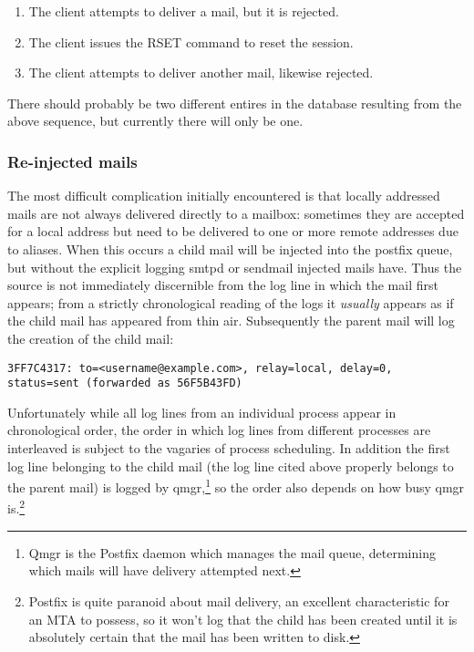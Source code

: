 \documentclass[a4paper,12pt,draft]{article}
\begin{document}
\begin{enumerate}

    \item The client attempts to deliver a mail, but it is rejected.

    \item The client issues the RSET command to reset the session.

    \item The client attempts to deliver another mail, likewise rejected.

\end{enumerate}

There should probably be two different entires in the database resulting
from the above sequence, but currently there will only be one.



\subsubsection{Re-injected mails}

The most difficult complication initially encountered is that locally
addressed mails are not always delivered directly to a mailbox: sometimes
they are accepted for a local address but need to be delivered to one or
more remote addresses due to aliases.  When this occurs a child mail will
be injected into the postfix queue, but without the explicit logging smtpd
or sendmail injected mails have.  Thus the source is not immediately
discernible from the log line in which the mail first appears; from a
strictly chronological reading of the logs it \textit{usually\/} appears as
if the child mail has appeared from thin air.  Subsequently the parent mail
will log the creation of the child mail:

\texttt{3FF7C4317: to=<username@example.com>, relay=local, \newline
delay=0, status=sent (forwarded as 56F5B43FD)}

Unfortunately while all log lines from an individual process appear in
chronological order, the order in which log lines from different processes
are interleaved is subject to the vagaries of process scheduling.  In
addition the first log line belonging to the child mail (the log line cited
above properly belongs to the parent mail) is logged by qmgr,\footnote{Qmgr
is the Postfix daemon which manages the mail queue, determining which mails
will have delivery attempted next.} so the order also depends on how busy
qmgr is.\footnote{Postfix is quite paranoid about mail delivery, an
excellent characteristic for an MTA to possess, so it won't log that the
child has been created until it is absolutely certain that the mail has
been written to disk.}
\end{document}
